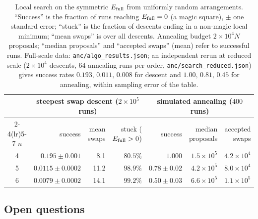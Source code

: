 \begin{table}[htbp]
\centering
\small
\begin{tabular}{c rrr rrr}
\toprule
 & \multicolumn{3}{c}{steepest swap descent ($2\times10^5$ runs)} & \multicolumn{3}{c}{simulated annealing ($400$ runs)}\\
\cmidrule(lr){2-4}\cmidrule(lr){5-7}
$n$ & success & mean swaps & stuck ($E_{\mathrm{full}}>0$) & success & median proposals & accepted swaps \\
\midrule
4 & $0.195\pm0.001$ & 8.1  & $80.5\%$ & $1.000$ & $1.5\times10^5$ & $4.2\times10^4$ \\
5 & $0.0115\pm0.0002$ & 11.2 & $98.9\%$ & $0.78\pm0.02$ & $4.2\times10^5$ & $8.0\times10^4$ \\
6 & $0.0079\pm0.0002$ & 14.1 & $99.2\%$ & $0.50\pm0.03$ & $6.6\times10^5$ & $1.1\times10^5$ \\
\bottomrule
\end{tabular}
\caption{Local search on the symmetric $E_{\mathrm{full}}$ from uniformly random arrangements.
``Success'' is the fraction of runs reaching $E_{\mathrm{full}}=0$ (a magic square), $\pm$ one
standard error; ``stuck'' is the fraction of descents ending in a non-magic local minimum; ``mean swaps'' is over all descents. Annealing
budget $2\times10^4N$ proposals; ``median proposals'' and ``accepted swaps'' (mean) refer to successful runs.
Full-scale data: \texttt{anc/algo\_results.json}; an independent rerun at reduced scale ($2\times10^4$ descents, $64$ annealing runs per order, \texttt{anc/search\_reduced.json}) gives success rates $0.193,\,0.011,\,0.008$ for descent and $1.00,\,0.81,\,0.45$ for annealing, within sampling error of the table.}
\label{tab:search}
\end{table}

\subsection{Open questions}

